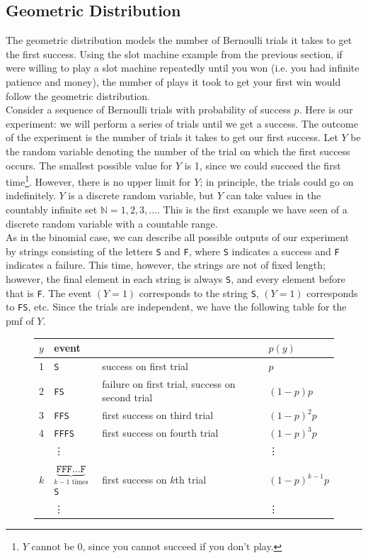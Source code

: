 \documentclass[12pt]{article}
\theoremstyle{definition}
\theoremstyle{remark}
\def\N{{\mathbb N}}
\begin{document}

\subsection{Geometric Distribution}

The geometric distribution models the number of Bernoulli trials it takes to get the first success. Using the slot machine example from the previous section, if were willing to play a slot machine repeatedly until you won (i.e. you had infinite patience and money), the number of plays it took to get your first win would follow the geometric distribution.\\

Consider a sequence of Bernoulli trials with probability of success $p$. Here is our experiment: we will perform a series of trials until we get a success. The outcome of the experiment is the number of trials it takes to get our first success. Let $Y$ be the random variable denoting the number of the trial on which the first success occurs.
The smallest possible value for $Y$ is 1, since we could succeed the first time\footnote{$Y$ cannot be 0, since you cannot succeed if you don't play.}. However, there is no upper limit for $Y$; in principle, the trials could go on indefinitely. $Y$ is a discrete random variable, but $Y$ can take values in the countably infinite set $\N = 1, 2, 3, \dots$. This is the first example we have seen of a discrete random variable with a countable range.\\

As in the binomial case, we can describe all possible outputs of our experiment by strings consisting of the letters \texttt{S} and \texttt{F}, where \texttt{S} indicates a success and \texttt{F} indicates a failure. This time, however, the strings are not of fixed length; however, the final element in each string is always \texttt{S}, and every element before that is \texttt{F}. The event $(Y = 1)$ corresponds to the string \texttt{S}, $(Y = 1)$ corresponds to \texttt{FS}, etc. Since the trials are independent, we have the following table for the pmf of $Y$.

\begin{figure}[H]
\centering
\begin{tabular}{llll}
\toprule
$y$ & event && $p(y)$\\
\midrule
1 & \texttt{S}     & success on first trial                          & $p$\\
2 & \texttt{FS}    & failure on first trial, success on second trial & $(1-p)p$\\
3 & \texttt{FFS}   & first success on third trial                    & $(1-p)^2 p$\\
4 & \texttt{FFFS}  & first success on fourth trial                   & $(1-p)^3 p$\\
& \vdots & & \vdots \\
$k$ & $\underbrace{ \texttt{FFF}\dots\texttt{F}}_{\text{$k - 1$ times}}$\texttt{S} & first success on $k$th trial & $(1-p)^{k-1} p$ \\
& \vdots & & \vdots \\
\bottomrule
\end{tabular}
\end{figure}
\end{document}
